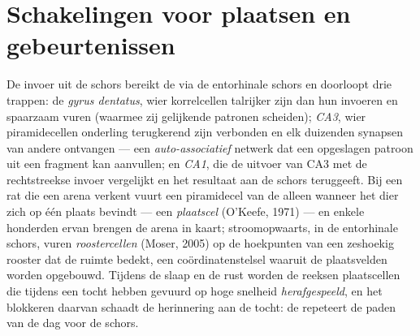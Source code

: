 \section{Schakelingen voor plaatsen en gebeurtenissen}

\begin{definition}\label{def:b3:learning-memory:hippocampus}
De invoer uit de schors bereikt de  via de entorhinale
schors en doorloopt drie trappen: de \emph{gyrus dentatus}, wier
korrelcellen talrijker zijn dan hun invoeren en spaarzaam vuren
(waarmee zij gelijkende patronen scheiden); \emph{CA3}, wier
piramidecellen onderling terugkerend zijn verbonden en elk duizenden
synapsen van andere ontvangen --- een \emph{auto-associatief} netwerk
dat een opgeslagen patroon uit een fragment kan aanvullen; en
\emph{CA1}, die de uitvoer van CA3 met de rechtstreekse invoer
vergelijkt en het resultaat aan de schors teruggeeft. Bij een rat die
een arena verkent vuurt een piramidecel van de  alleen
wanneer het dier zich op één plaats bevindt --- een \emph{plaatscel}
(O'Keefe, 1971) --- en enkele honderden ervan brengen de arena in
kaart; stroomopwaarts, in de entorhinale schors, vuren
\emph{roostercellen} (Moser, 2005) op de hoekpunten van een zeshoekig
rooster dat de ruimte bedekt, een coördinatenstelsel waaruit de
plaatsvelden worden opgebouwd. Tijdens de slaap en de rust worden de
reeksen plaatscellen die tijdens een tocht hebben gevuurd op hoge
snelheid \emph{herafgespeeld}, en het blokkeren daarvan schaadt de
herinnering aan de tocht: de  repeteert de paden van de dag
voor de schors.
\end{definition}

